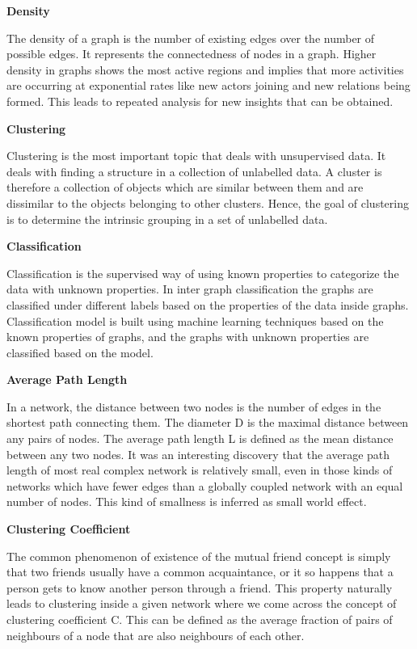 {\bf Density}

The density of a graph is the number of existing edges over the number of possible edges. It represents the connectedness of nodes in a graph. Higher density in graphs shows the most active regions and implies that more activities are occurring at exponential rates like new actors joining and new relations being formed. This leads to repeated analysis for new insights that can be obtained.


{\bf Clustering}

Clustering is the most important topic that deals with unsupervised data. It deals with finding a structure in a collection of unlabelled data. A cluster is therefore a collection of objects which are similar between them and are dissimilar to the objects belonging to other clusters. Hence, the goal of clustering is to determine the intrinsic grouping in a set of unlabelled data.

{\bf Classification}

Classification is the supervised way of using known properties to categorize the data with unknown properties. In inter graph classification the graphs are classified under different labels based on the properties of the data inside graphs. Classification model is built using machine learning techniques based on the known properties of graphs, and the graphs with unknown properties are classified based on the model.

{\bf Average Path Length} 

In a network, the distance between two nodes is the number of edges in the shortest path connecting them. The diameter D is the maximal distance between any pairs of nodes. The average path length L is defined as the mean distance between any two nodes. It was an interesting discovery that the average path length of most real complex network is relatively small, even in those kinds of networks which have fewer edges than a globally coupled network with an equal number of nodes. This kind of smallness is inferred as small world effect. 

{\bf Clustering Coefficient} 

The common phenomenon of existence of the mutual friend concept is simply that two friends usually have a common acquaintance, or it so happens that a person gets to know another person through a friend. This property naturally leads to clustering inside a given network where we come across the concept of clustering coefficient C. This can be defined as the average fraction of pairs of neighbours of a node that are also neighbours of each other. 

